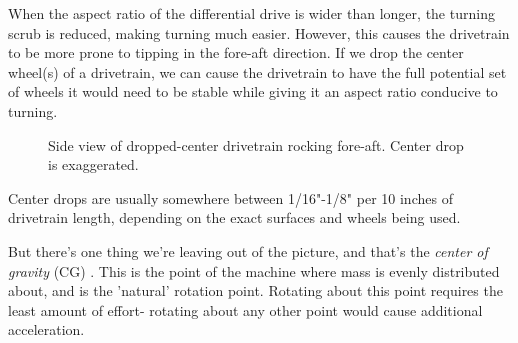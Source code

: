 When the aspect ratio of the differential drive is wider than longer, the turning scrub is reduced, making turning much easier. However, this causes the drivetrain to be more prone to tipping in the fore-aft direction. If we drop the center wheel(s) of a drivetrain, we can cause the drivetrain to have the full potential set of wheels it would need to be stable while giving it an aspect ratio conducive to turning.

\begin{figure}[H]
\begin{subfigure}[]{0.45\linewidth}
\end{subfigure}\begin{subfigure}[]{0.45\linewidth}
\end{subfigure}
\caption{Side view of dropped-center drivetrain rocking fore-aft. Center drop is exaggerated.}
\end{figure}

Center drops are usually somewhere between 1/16"-1/8" per 10 inches of drivetrain length, depending on the exact surfaces and wheels being used.

But there's one thing we're leaving out of the picture, and that's the \textit{center of gravity} (CG) . This is the point of the machine where mass is evenly distributed about, and is the 'natural' rotation point. Rotating about this point requires the least amount of effort- rotating  about any other point would cause additional acceleration.


